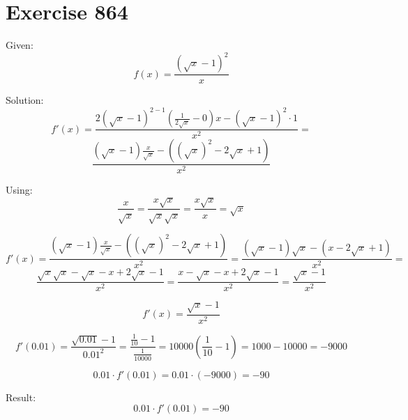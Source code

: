 \documentclass[a4paper, 10pt]{scrartcl}
\begin{document}
\section{Exercise 864}

Given:
\[
f(x) = \frac{(\sqrt{x} - 1)^{2}}{x}
\]

Solution:
\[
f'(x) = \frac{2(\sqrt{x} - 1)^{2 - 1}(\frac{1}{2\sqrt{x}} - 0)x - (\sqrt{x} - 1)^{2}\cdot1}{x^{2}} =
\]
\[
\frac{(\sqrt{x} - 1)\frac{x}{\sqrt{x}} - ((\sqrt{x})^{2} - 2\sqrt{x} + 1)}{x^{2}}
\]

Using:
\[
\frac{x}{\sqrt{x}} = \frac{x\sqrt{x}}{\sqrt{x}\sqrt{x}} = \frac{x\sqrt{x}}{x} = \sqrt{x}
\]

\[
f'(x) = \frac{(\sqrt{x} - 1)\frac{x}{\sqrt{x}} - ((\sqrt{x})^{2} - 2\sqrt{x} + 1)}{x^{2}} =
\frac{(\sqrt{x} - 1)\sqrt{x} - (x - 2\sqrt{x} + 1)}{x^{2}} =
\]
\[
\frac{\sqrt{x}\sqrt{x} - \sqrt{x} - x + 2\sqrt{x} - 1}{x^{2}} = \frac{x - \sqrt{x} - x + 2\sqrt{x} - 1}{x^{2}} = 
\frac{\sqrt{x} - 1}{x^{2}}
\]

\[
f'(x) = \frac{\sqrt{x} - 1}{x^{2}}
\]

\[
f'(0.01) = \frac{\sqrt{0.01} - 1}{0.01^{2}} = \frac{\frac{1}{10} - 1}{\frac{1}{10000}} = 10000(\frac{1}{10} - 1) =
1000 - 10000 = -9000
\]

\[
0.01\cdot f'(0.01) = 0.01\cdot(-9000) = -90
\]

Result:
\[
0.01\cdot f'(0.01) = -90
\]
\end{document}
